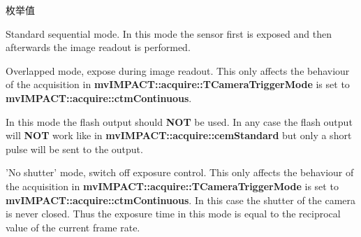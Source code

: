 \begin{Desc}
\item[枚举值]\par
\begin{description}
\item[{\em 
\hypertarget{group___device_specific_interface_gga40926eaa36a3af4b5d380723be4024b9a25972ede690fb80a009f25cce3a553de}{cem\+Standard}\label{group___device_specific_interface_gga40926eaa36a3af4b5d380723be4024b9a25972ede690fb80a009f25cce3a553de}
}]Standard sequential mode. In this mode the sensor first is exposed and then afterwards the image readout is performed. \item[{\em 
\hypertarget{group___device_specific_interface_gga40926eaa36a3af4b5d380723be4024b9affdf8bc3bfffb19274ce8adce54ceb52}{cem\+Overlapped}\label{group___device_specific_interface_gga40926eaa36a3af4b5d380723be4024b9affdf8bc3bfffb19274ce8adce54ceb52}
}]Overlapped mode, expose during image readout. This only affects the behaviour of the acquisition in {\bfseries mv\+I\+M\+P\+A\+C\+T\+::acquire\+::\+T\+Camera\+Trigger\+Mode} is set to {\bfseries mv\+I\+M\+P\+A\+C\+T\+::acquire\+::ctm\+Continuous}.

In this mode the flash output should {\bfseries N\+O\+T} be used. In any case the flash output will {\bfseries N\+O\+T} work like in {\bfseries mv\+I\+M\+P\+A\+C\+T\+::acquire\+::cem\+Standard} but only a short pulse will be sent to the output. \item[{\em 
\hypertarget{group___device_specific_interface_gga40926eaa36a3af4b5d380723be4024b9a0de6d7be571d066c30df4df4d0536b98}{cem\+No\+Shutter}\label{group___device_specific_interface_gga40926eaa36a3af4b5d380723be4024b9a0de6d7be571d066c30df4df4d0536b98}
}]'No shutter' mode, switch off exposure control. This only affects the behaviour of the acquisition in {\bfseries mv\+I\+M\+P\+A\+C\+T\+::acquire\+::\+T\+Camera\+Trigger\+Mode} is set to {\bfseries mv\+I\+M\+P\+A\+C\+T\+::acquire\+::ctm\+Continuous}. In this case the shutter of the camera is never closed. Thus the exposure time in this mode is equal to the reciprocal value of the current frame rate. \end{description}
\end{Desc}
